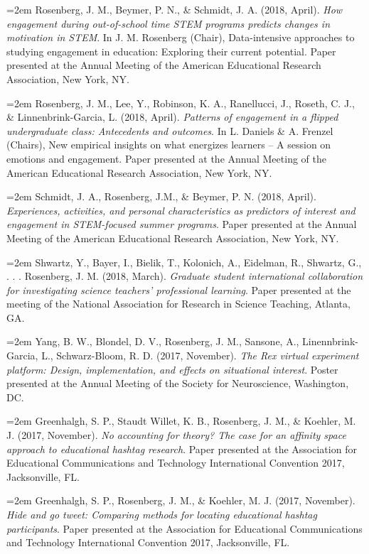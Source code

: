 \documentclass[14,]{article}
\begin{document}
\hangindent=2em Rosenberg, J. M., Beymer, P. N., \& Schmidt, J. A.
(2018, April). \emph{How engagement during out-of-school time STEM
programs predicts changes in motivation in STEM}. In J. M. Rosenberg
(Chair), Data-intensive approaches to studying engagement in education:
Exploring their current potential. Paper presented at the Annual Meeting
of the American Educational Research Association, New York, NY.

\hangindent=2em Rosenberg, J. M., Lee, Y., Robinson, K. A., Ranellucci,
J., Roseth, C. J., \& Linnenbrink-Garcia, L. (2018, April).
\emph{Patterns of engagement in a flipped undergraduate class:
Antecedents and outcomes}. In L. Daniels \& A. Frenzel (Chairs), New
empirical insights on what energizes learners -- A session on emotions
and engagement. Paper presented at the Annual Meeting of the American
Educational Research Association, New York, NY.

\hangindent=2em Schmidt, J. A., Rosenberg, J.M., \& Beymer, P. N. (2018,
April). \emph{Experiences, activities, and personal characteristics as
predictors of interest and engagement in STEM-focused summer programs}.
Paper presented at the Annual Meeting of the American Educational
Research Association, New York, NY.

\hangindent=2em Shwartz, Y., Bayer, I., Bielik, T., Kolonich, A.,
Eidelman, R., Shwartz, G., . . . Rosenberg, J. M. (2018, March).
\emph{Graduate student international collaboration for investigating
science teachers' professional learning}. Paper presented at the meeting
of the National Association for Research in Science Teaching, Atlanta,
GA.

\hangindent=2em Yang, B. W., Blondel, D. V., Rosenberg, J. M., Sansone,
A., Linennbrink-Garcia, L., Schwarz-Bloom, R. D. (2017, November).
\emph{The Rex virtual experiment platform: Design, implementation, and
effects on situational interest}. Poster presented at the Annual Meeting
of the Society for Neuroscience, Washington, DC.

\hangindent=2em Greenhalgh, S. P., Staudt Willet, K. B., Rosenberg, J.
M., \& Koehler, M. J. (2017, November). \emph{No accounting for theory?
The case for an affinity space approach to educational hashtag
research}. Paper presented at the Association for Educational
Communications and Technology International Convention 2017,
Jacksonville, FL.

\hangindent=2em Greenhalgh, S. P., Rosenberg, J. M., \& Koehler, M. J.
(2017, November). \emph{Hide and go tweet: Comparing methods for
locating educational hashtag participants}. Paper presented at the
Association for Educational Communications and Technology International
Convention 2017, Jacksonville, FL.
\end{document}
